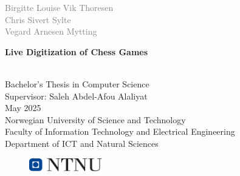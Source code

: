 \begin{titlepage}
\vspace*{1.5cm}

\noindent  \textcolor{gray}{\large 
Birgitte Louise Vik Thoresen \\ 
Chris Sivert Sylte \\ 
Vegard Arnesen Mytting} \\
\vspace{1cm}

\noindent \textbf{\Large Live Digitization of Chess Games} \\
\vspace{0.5cm}

 \\

\vspace{7cm}
\noindent Bachelor's Thesis in Computer Science \\
Supervisor: Saleh Abdel-Afou Alaliyat \\
May 2025 \\

\vspace{0.2cm}
\noindent Norwegian University of Science and Technology \\
Faculty of Information Technology and Electrical Engineering \\
Department of ICT and Natural Sciences \\

\begin{figure}[h]
    \includegraphics[width=0.28\textwidth]{figures/ntnu_basic.png}
\end{figure}
\end{titlepage}
\restoregeometry
\myemptypage %